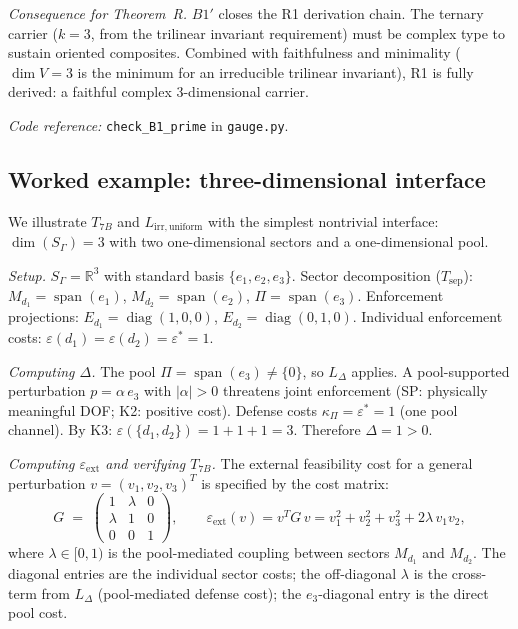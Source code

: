 \documentclass[11pt,a4paper]{article}
\theoremstyle{definition}
\newcommand{\eps}{\varepsilon}
\DeclareMathOperator{\spn}{span}
\DeclareMathOperator{\diag}{diag}
\newcommand{\coderef}[2]{\smallskip\noindent\textit{Code reference:} \texttt{#1} in \texttt{#2}.}
\begin{document}
\smallskip\noindent\textit{Consequence for Theorem~R.}\quad
$B1'$ closes the R1 derivation chain.  The ternary carrier ($k = 3$, from
the trilinear invariant requirement) must be complex type to sustain
oriented composites.  Combined with faithfulness and minimality
($\dim V = 3$ is the minimum for an irreducible trilinear invariant),
R1 is fully derived: a faithful complex 3-dimensional carrier.

\coderef{check\_B1\_prime}{gauge.py}


\subsection{Worked example: three-dimensional interface}
\label{sec:worked_example}

We illustrate $T_{7B}$ and $L_{\mathrm{irr,uniform}}$ with the simplest
nontrivial interface: $\dim(S_\Gamma) = 3$ with two one-dimensional
sectors and a one-dimensional pool.

\smallskip\noindent\textit{Setup.}\quad
$S_\Gamma = \mathbb{R}^3$ with standard basis $\{e_1, e_2, e_3\}$.
Sector decomposition ($T_{\mathrm{sep}}$):
$M_{d_1} = \spn(e_1)$, $M_{d_2} = \spn(e_2)$, $\Pi = \spn(e_3)$.
Enforcement projections:
$E_{d_1} = \diag(1,0,0)$, $E_{d_2} = \diag(0,1,0)$.
Individual enforcement costs: $\eps(d_1) = \eps(d_2) = \eps^* = 1$.

\smallskip\noindent\textit{Computing $\Delta$.}\quad
The pool $\Pi = \spn(e_3) \ne \{0\}$, so $L_\Delta$ applies.
A pool-supported perturbation $p = \alpha\, e_3$ with $|\alpha| > 0$
threatens joint enforcement (SP: physically meaningful DOF;
K2: positive cost).  Defense costs $\kappa_\Pi = \eps^* = 1$ (one pool
channel).  By K3: $\eps(\{d_1, d_2\}) = 1 + 1 + 1 = 3$.
Therefore $\Delta = 1 > 0$.

\smallskip\noindent\textit{Computing $\varepsilon_{\mathrm{ext}}$ and
verifying $T_{7B}$.}\quad
The external feasibility cost for a general perturbation
$v = (v_1, v_2, v_3)^T$ is specified by the cost matrix:
\[
  G \;=\; \begin{pmatrix}
    1 & \lambda & 0 \\
    \lambda & 1 & 0 \\
    0 & 0 & 1
  \end{pmatrix},
  \qquad
  \varepsilon_{\mathrm{ext}}(v) = v^T G\, v
  = v_1^2 + v_2^2 + v_3^2 + 2\lambda\, v_1 v_2,
\]
where $\lambda \in [0, 1)$ is the pool-mediated coupling between sectors
$M_{d_1}$ and $M_{d_2}$.  The diagonal entries are the individual sector
costs; the off-diagonal $\lambda$ is the cross-term from $L_\Delta$
(pool-mediated defense cost); the $e_3$-diagonal entry is the direct
pool cost.
\end{document}
